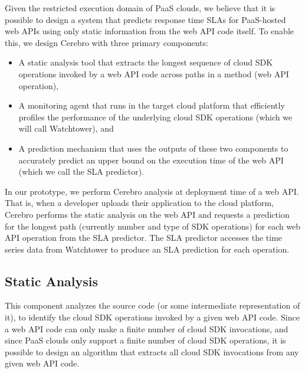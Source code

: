 Given the restricted execution domain of PaaS clouds, we believe that it is possible
to design a system that predicts response time SLAs for PaaS-hosted web APIs using only
static information from the web API code itself.  To enable this, we design Cerebro
with three primary components:
\begin{itemize}
\item A static analysis tool that extracts the longest sequence of cloud SDK operations invoked by a web API code across paths in a method (web API operation),
\item A monitoring agent that runs in the target cloud platform that efficiently profiles the performance of the underlying cloud SDK operations (which we will call Watchtower), and
\item A prediction mechanism that uses the outputs of these two components to accurately predict an upper bound on the execution time of the web API (which we call the SLA predictor).
\end{itemize}
In our prototype, we perform Cerebro analysis at deployment time of a web API.  That is,
when a developer uploads their application to the cloud platform, Cerebro performs
the static analysis on the web API and requests a prediction for the longest path (currently
number and type of SDK operations) for each web API operation from the SLA predictor.
The SLA predictor accesses the time series data from Watchtower to produce an 
SLA prediction for each operation.



\subsection{Static Analysis}
 This component analyzes the source code 
(or some intermediate representation of it), to identify
 the cloud SDK operations invoked by a given web API code. 
Since a web API code can only make a finite
 number of cloud SDK invocations, and since PaaS clouds only support a finite number of cloud
 SDK operations, it is possible to design an algorithm that
 extracts all cloud SDK invocations from any given web API code. 

